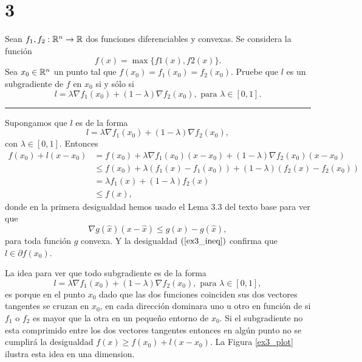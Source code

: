 \section*{3}

Sean $f_1 , f_2 : \mathbb{R}^n \rightarrow \mathbb{R}$ dos funciones diferenciables y convexas. Se considera la función
\begin{equation*}
    f (x) = \max \{f1 (x), f2 (x)\}.
\end{equation*}
Sea $x_0 \in \mathbb{R}^n$ un punto tal que $f (x_0) = f_1 (x_0) = f_2 (x_0)$.
Pruebe que $l$ es un subgradiente de $f$ en $x_0$ si y sólo si
\begin{equation*}
    l = \lambda \nabla f_1 (x_0) + (1 - \lambda) \nabla f_2 (x_0), \text{ para } \lambda \in [0, 1]. 
\end{equation*}

\noindent\rule{10cm}{0.4pt}

Supongamos que $l$ es de la forma
\begin{equation*}
    l = \lambda \nabla f_1 (x_0) + (1 - \lambda) \nabla f_2 (x_0),
\end{equation*}
con $\lambda \in [0, 1]$.
Entonces
\begin{equation}\label{ex3_ineq}
\begin{aligned}
    f(x_0) + l(x - x_0)
        & = f(x_0) + \lambda \nabla f_1 (x_0) (x - x_0) + (1 - \lambda) \nabla f_2 (x_0) (x - x_0) \\
        & \leq f(x_0) + \lambda (f_1(x) - f_1(x_0)) + (1 - \lambda) (f_2(x) - f_2(x_0)) \\
        & = \lambda f_1(x) + (1 - \lambda) f_2(x) \\
        & \leq f(x),
\end{aligned}
\end{equation}
donde en la primera desigualdad hemos usado el Lema 3.3 del texto base para ver que
\begin{equation*}
    \nabla g (\hat{x}) (x - \hat{x}) \leq g(x) - g(\hat{x}),
\end{equation*}
para toda función $g$ convexa.
Y la desigualdad $(\ref{ex3_ineq})$ confirma que $l \in \partial f(x_0)$.

La idea para ver que todo subgradiente es de la forma
\begin{equation*}
    l = \lambda \nabla f_1 (x_0) + (1 - \lambda) \nabla f_2 (x_0), \text{ para } \lambda \in [0, 1],
\end{equation*}
es porque en el punto $x_0$ dado que las dos funciones coinciden sus dos vectores tangentes se cruzan en $x_0$,
en cada dirección dominara uno u otro en función de si $f_1$ o $f_2$ es mayor que la otra en un pequeño entorno de $x_0$.
Si el subgradiente no esta comprimido entre los dos vectores tangentes entonces en algún punto no se cumplirá la desigualdad $f(x) \geq f(x_0) + l(x - x_0)$.
La Figura \ref{ex3_plot} ilustra esta idea en una dimension.

